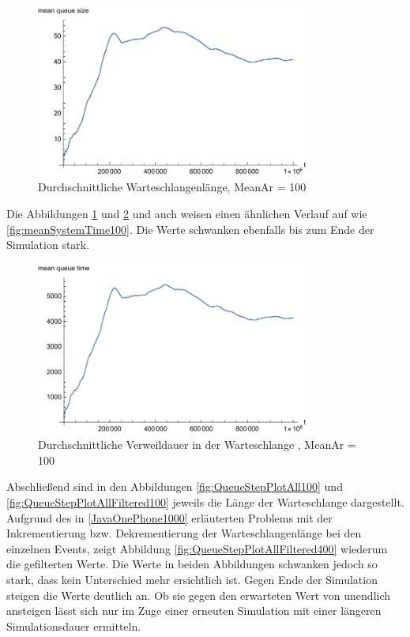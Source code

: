\begin{figure}[htpb]
	\centering
	\includegraphics[width=0.8\textwidth]{abbildungen/1_Phone/Arrival_100_Serve_100_dur_1000000_Skip_0/MeanQueueSize.pdf}
	\caption{Durchschnittliche Warteschlangenlänge, MeanAr = 100}
	\label{fig:meanQueueSize100}
\end{figure}

Die Abbildungen \ref{fig:meanQueueSize100} und \ref{fig:meanQueueTime100} und auch weisen einen ähnlichen Verlauf auf wie \ref{fig:meanSystemTime100}. Die Werte schwanken ebenfalls bis zum Ende der Simulation stark.

\begin{figure}[htpb]
	\centering
	\includegraphics[width=0.8\textwidth]{abbildungen/1_Phone/Arrival_100_Serve_100_dur_1000000_Skip_0/MeanQueueTime.pdf}
	\caption{Durchschnittliche Verweildauer in der Warteschlange , MeanAr = 100}
	\label{fig:meanQueueTime100}
\end{figure}

Abschließend sind in den Abbildungen \ref{fig:QueueStepPlotAll100} und \ref{fig:QueueStepPlotAllFiltered100} jeweils die Länge der Warteschlange dargestellt. Aufgrund des in \ref{JavaOnePhone1000} erläuterten Problems mit der Inkrementierung bzw. Dekrementierung der Warteschlangenlänge bei den einzelnen Events, zeigt Abbildung \ref{fig:QueueStepPlotAllFiltered400} wiederum die gefilterten Werte. Die Werte in beiden Abbildungen schwanken jedoch so stark, dass kein Unterschied mehr ersichtlich ist. Gegen Ende der Simulation steigen die Werte deutlich an. Ob sie gegen den erwarteten Wert von unendlich ansteigen lässt sich nur im Zuge einer erneuten Simulation mit einer längeren Simulationsdauer ermitteln.

